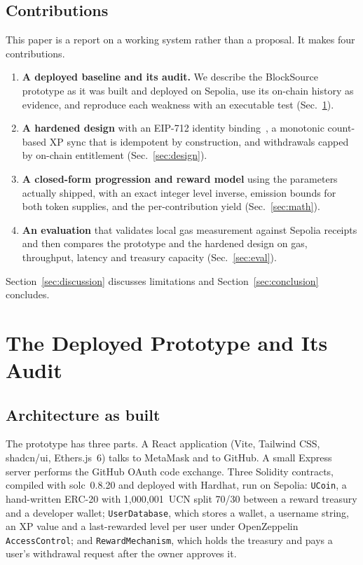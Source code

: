\documentclass[conference]{IEEEtran}
\begin{document}
\subsection{Contributions}
This paper is a report on a working system rather than a proposal. It makes four contributions.
\begin{enumerate}
\item \textbf{A deployed baseline and its audit.} We describe the BlockSource prototype as it was built and deployed on Sepolia, use its on-chain history as evidence, and reproduce each weakness with an executable test (Sec.~\ref{sec:v1}).
\item \textbf{A hardened design} with an EIP-712 identity binding~\cite{eip712}, a monotonic count-based XP sync that is idempotent by construction, and withdrawals capped by on-chain entitlement (Sec.~\ref{sec:design}).
\item \textbf{A closed-form progression and reward model} using the parameters actually shipped, with an exact integer level inverse, emission bounds for both token supplies, and the per-contribution yield (Sec.~\ref{sec:math}).
\item \textbf{An evaluation} that validates local gas measurement against Sepolia receipts and then compares the prototype and the hardened design on gas, throughput, latency and treasury capacity (Sec.~\ref{sec:eval}).
\end{enumerate}
Section~\ref{sec:discussion} discusses limitations and Section~\ref{sec:conclusion} concludes.

\section{The Deployed Prototype and Its Audit}\label{sec:v1}

\subsection{Architecture as built}
The prototype has three parts. A React application (Vite, Tailwind CSS, shadcn/ui, Ethers.js~6) talks to MetaMask and to GitHub. A small Express server performs the GitHub OAuth code exchange. Three Solidity contracts, compiled with solc~0.8.20 and deployed with Hardhat, run on Sepolia: \texttt{UCoin}, a hand-written ERC-20 with 1{,}000{,}001~UCN split 70/30 between a reward treasury and a developer wallet; \texttt{UserDatabase}, which stores a wallet, a username string, an XP value and a last-rewarded level per user under OpenZeppelin \texttt{AccessControl}; and \texttt{RewardMechanism}, which holds the treasury and pays a user's withdrawal request after the owner approves it.
\end{document}
